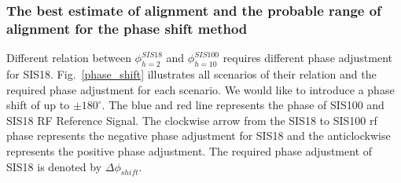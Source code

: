 \subsubsection{The best estimate of alignment and the probable range of alignment for the phase shift method}
Different relation between $\phi_{h=2}^{SIS18}$ and $\phi_{h=10}^{SIS100}$ requires different phase adjustment for SIS18. Fig.~\ref{phase_shift} illustrates all scenarios of their relation and the required phase adjustment for each scenario. We would like to introduce a phase shift of up to $\pm 180^\circ$. The blue and red line represents the phase of SIS100 and SIS18 RF Reference Signal. The clockwise arrow from the SIS18 to SIS100 rf phase represents   the negative phase adjustment for SIS18 and the anticlockwise represents the positive phase adjustment. The required phase adjustment of SIS18 is denoted by $\Delta \phi_{shift}$.
